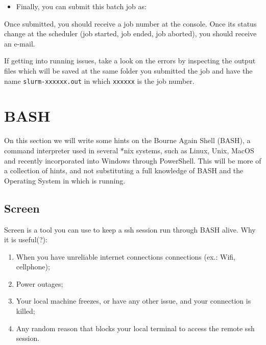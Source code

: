 \documentclass[
]{book}
\newenvironment{Shaded}{\begin{snugshade}}{\end{snugshade}}
\newcommand{\ExtensionTok}[1]{#1}
\newcommand{\NormalTok}[1]{#1}
\providecommand{\tightlist}{%
  \setlength{\itemsep}{0pt}\setlength{\parskip}{0pt}}
\begin{document}
\begin{itemize}
\tightlist
\item
  Finally, you can submit this batch job as:
\end{itemize}

\begin{Shaded}
\end{Shaded}

Once submitted, you should receive a job number at the console. Once its status
change at the scheduler (job started, job ended, job aborted), you should receive
an e-mail.

If getting into running issues, take a look on the errors by inspecting the
output files which will be saved at the same folder you submitted the job and
have the name \texttt{slurm-xxxxxx.out} in which \texttt{xxxxxx} is the job number.

\hypertarget{bash}{%
\chapter{BASH}\label{bash}}

On this section we will write some hints on the Bourne Again Shell (BASH), a command interpreter used in several *nix systems, such as Linux, Unix, MacOS and recently incorporated into Windows through PowerShell. This will be more of a collection of hints, and not substituting a full knowledge of BASH and the Operating System in which is running.

\hypertarget{screen}{%
\section{Screen}\label{screen}}

Screen is a tool you can use to keep a ssh session run through BASH alive. Why it is useful(?):

\begin{enumerate}
\def\labelenumi{\arabic{enumi}.}
\tightlist
\item
  When you have unreliable internet connections connections (ex.: Wifi, cellphone);
\item
  Power outages;
\item
  Your local machine freezes, or have any other issue, and your connection is killed;
\item
  Any random reason that blocks your local terminal to access the remote ssh session.
\end{enumerate}
\end{document}
